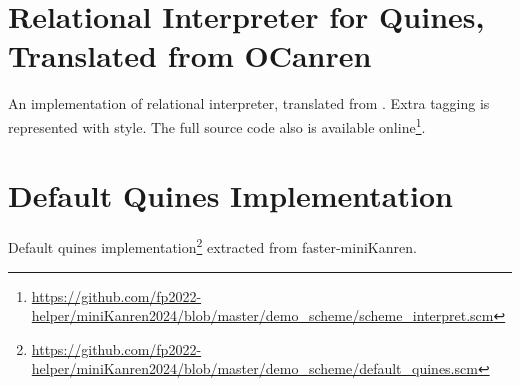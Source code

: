 \appendix
\section{Relational Interpreter for Quines, Translated from OCanren}
\label{appendix:synQuines}

An implementation of relational interpreter, translated from \OCanren{}. Extra tagging is represented with \textbf{} style.
The full source code also is available online\footnote{\url{https://github.com/fp2022-helper/miniKanren2024/blob/master/demo_scheme/scheme_interpret.scm}}.



\section{Default Quines Implementation}
\label{appendix:defaultQuines}
Default quines implementation\footnote{\url{https://github.com/fp2022-helper/miniKanren2024/blob/master/demo_scheme/default_quines.scm}} extracted from faster-miniKanren.

